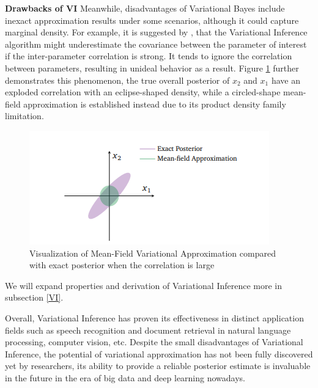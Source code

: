 \textbf{Drawbacks of VI}
Meanwhile, disadvantages of Variational Bayes include inexact approximation results under some scenarios, although it could capture marginal density. For example, it is suggested by \cite{blei_kucukelbir_mcauliffe_2017},
that the Variational Inference algorithm might underestimate the covariance between the parameter of interest if the inter-parameter correlation is strong. It tends to ignore the correlation between parameters, resulting in unideal behavior as a result. Figure \ref{fig:VIdemo}
further demonstrates this phenomenon, the true overall posterior of $x_2$ and $x_1$ have an exploded correlation with an eclipse-shaped density, while a circled-shape mean-field approximation is established instead due to its product density family limitation.
\begin{figure}
	\includegraphics[width=\linewidth]{VIdemo}
	\caption{Visualization of Mean-Field Variational Approximation compared with exact posterior when the correlation is large}
	\label{fig:VIdemo}
\end{figure}
We will expand properties and derivation of Variational Inference more in subsection \ref{VI}.

Overall, Variational Inference has proven its effectiveness in distinct application fields such as speech recognition and document retrieval in natural language processing, computer vision, etc. Despite the small disadvantages of Variational Inference, the potential of variational approximation has not been fully discovered yet by researchers, its ability to provide a reliable posterior estimate is invaluable in the future in the era of big data and deep learning nowadays.

